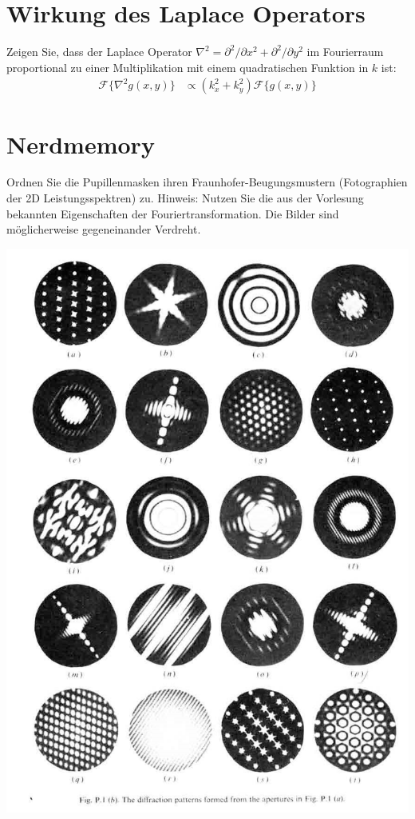 \documentclass{article}
\begin{document}
\section{Wirkung des Laplace Operators }
Zeigen Sie, dass der Laplace Operator $\nabla^2 = \partial^2/\partial
x^2 + \partial^2/\partial y^2$ im Fourierraum proportional zu einer
Multiplikation mit einem quadratischen Funktion in $k$ ist:
\begin{align}
  \mathcal{F}\{\nabla^2 g(x,y)\} &\propto (k_x^2+k_y^2) \mathcal{F}\{g(x,y)\}
\end{align}

\section{Nerdmemory}
Ordnen Sie die Pupillenmasken ihren Fraunhofer-Beugungsmustern
(Fotographien der 2D Leistungsspektren) zu. Hinweis: Nutzen Sie die
aus der Vorlesung bekannten Eigenschaften der
Fouriertransformation. Die Bilder sind m\"oglicherweise gegeneinander
Verdreht.

\includegraphics[height=.72\textheight, angle=90]{FrequencySpace}
\end{document}
